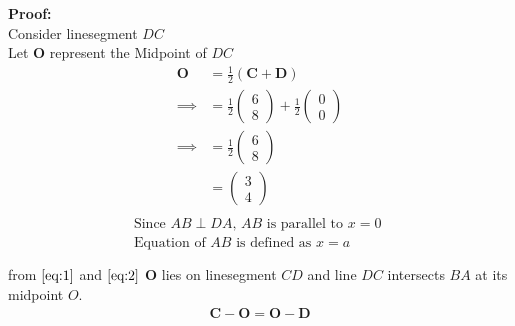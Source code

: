 \documentclass{article}
\newcommand{\myvec}[1]{\ensuremath{\begin{pmatrix}#1\end{pmatrix}}}
\let\vec\mathbf
\begin{document}
\textbf{Proof:}\\
Consider linesegment $DC$\\
Let $\vec{O}$ represent the Midpoint of $DC$
\begin{align}
	\vec{O}&=\frac{1}{2}(\vec{C}+\vec{D})\\
	\implies &= \frac{1}{2}\myvec{6\\8}+\frac{1}{2}\myvec{0\\0}\\
	\implies &= \frac{1}{2}\myvec{6\\8}\\
		 &=\myvec{3\\4}
		 \label{eq:1}\\
\end{align}
\begin{align}
	\text { Since $AB\perp DA$, $AB$ is parallel to $x=0$ }\\
	\text { Equation of $AB$ is defined as $x=a$}\\
	\label{eq:2}\\
\end{align}
from $\eqref{eq:1}$ and $\eqref{eq:2}$
$\vec{O}$ lies on linesegment $CD$ and line $DC$ intersects $BA$ at its midpoint $O$.
\begin{align}
\vec{C}-\vec{O}=\vec{O}-\vec{D}
\end{align}
\end{document}
